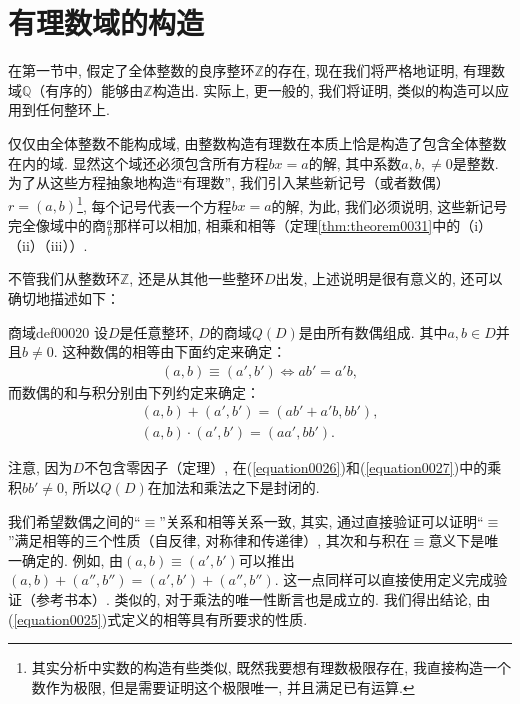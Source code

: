 \section{有理数域的构造}\label{subsection00202}
在第一节中, 假定了全体整数的良序整环$\mathbb{Z}$的存在, 现在我们将严格地证明, 有理数域$\mathbb{Q}$（有序的）能够由$\mathbb{Z}$构造出. 实际上, 更一般的, 我们将证明, 类似的构造可以应用到任何整环上. 

仅仅由全体整数不能构成域, 由整数构造有理数在本质上恰是构造了包含全体整数在内的域. 显然这个域还必须包含所有方程$bx=a$的解, 其中系数$a,b,\neq 0$是整数. 为了从这些方程抽象地构造“有理数”, 我们引入某些新记号（或者数偶）$r=(a,b)$\footnote{其实分析中实数的构造有些类似, 既然我要想有理数极限存在, 我直接构造一个数作为极限, 但是需要证明这个极限唯一, 并且满足已有运算. }, 每个记号代表一个方程$bx=a$的解, 为此, 我们必须说明, 这些新记号完全像域中的商$\frac{a}{b}$那样可以相加, 相乘和相等（定理\ref{thm:theorem0031}中的（i）（ii）（iii））. 

不管我们从整数环$\mathbb{Z}$, 还是从其他一些整环$D$出发, 上述说明是很有意义的, 还可以确切地描述如下：
\begin{definition}{商域}{def00020}
设$D$是任意整环, $D$的商域$Q(D)$是由所有数偶组成. 其中$a, b \in D$并且$b \neq 0$. 这种数偶的相等由下面约定来确定：
\begin{gather}\label{equation0025}
(a,b) \equiv (a',b') \Leftrightarrow ab'=a'b,
\end{gather}
而数偶的和与积分别由下列约定来确定：
\begin{gather}
(a,b) + (a', b') = (ab'+a'b, bb'),\label{equation0026}\\
(a, b) \cdot (a', b') = (aa', bb').\label{equation0027}
\end{gather}
\end{definition}

注意, 因为$D$不包含零因子（定理）, 在(\ref{equation0026})和(\ref{equation0027})中的乘积$bb' \neq 0$, 所以$Q(D)$在加法和乘法之下是封闭的. 

我们希望数偶之间的“$\equiv$”关系和相等关系一致, 其实, 通过直接验证可以证明“$\equiv$”满足相等的三个性质（自反律, 对称律和传递律）, 其次和与积在$\equiv$意义下是唯一确定的. 例如, 由$(a,b) \equiv (a', b')$可以推出$(a, b)+(a'', b'')=(a',b')+(a'', b'')$. 这一点同样可以直接使用定义完成验证（参考书本）. 类似的, 对于乘法的唯一性断言也是成立的. 我们得出结论, 由(\ref{equation0025})式定义的相等具有所要求的性质. 

